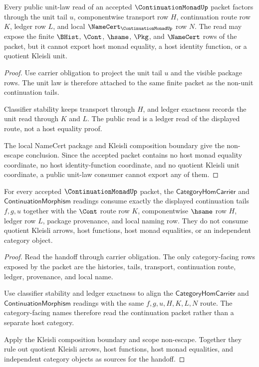\begin{theorem}
\label{thm:continuation-monad-unit-route-nonescape}
Every public unit-law read of an accepted $\ContinuationMonadUp$ packet factors through the unit tail $u$, componentwise transport row $H$, continuation route row $K$, ledger row $L$, and local $\NameCert_{\ContinuationMonadUp}$ row $N$. The read may expose the finite $\BHist$, $\Cont$, $\hsame$, $\Pkg$, and $\NameCert$ rows of the packet, but it cannot export host monad equality, a host identity function, or a quotient Kleisli unit.
\end{theorem}
\begin{proof}
Use carrier obligation to project the unit tail $u$ and the visible package rows. The unit law is therefore attached to the same finite packet as the non-unit continuation tails.

Classifier stability keeps transport through $H$, and ledger exactness records the unit read through $K$ and $L$. The public read is a ledger read of the displayed route, not a host equality proof.

The local NameCert package and Kleisli composition boundary give the non-escape conclusion. Since the accepted packet contains no host monad equality coordinate, no host identity-function coordinate, and no quotient Kleisli unit coordinate, a public unit-law consumer cannot export any of them.
\end{proof}

\begin{theorem}
\label{thm:continuation-monad-category-handoff-exactness}
For every accepted $\ContinuationMonadUp$ packet, the $\mathsf{CategoryHomCarrier}$ and $\mathsf{ContinuationMorphism}$ readings consume exactly the displayed continuation tails $f,g,u$ together with the $\Cont$ route row $K$, componentwise $\hsame$ row $H$, ledger row $L$, package provenance, and local naming row. They do not consume quotient Kleisli arrows, host functions, host monad equalities, or an independent category object.
\end{theorem}
\begin{proof}
Read the handoff through carrier obligation. The only category-facing rows exposed by the packet are the histories, tails, transport, continuation route, ledger, provenance, and local name.

Use classifier stability and ledger exactness to align the $\mathsf{CategoryHomCarrier}$ and $\mathsf{ContinuationMorphism}$ readings with the same $f,g,u,H,K,L,N$ route. The category-facing names therefore read the continuation packet rather than a separate host category.

Apply the Kleisli composition boundary and scope non-escape. Together they rule out quotient Kleisli arrows, host functions, host monad equalities, and independent category objects as sources for the handoff.
\end{proof}

